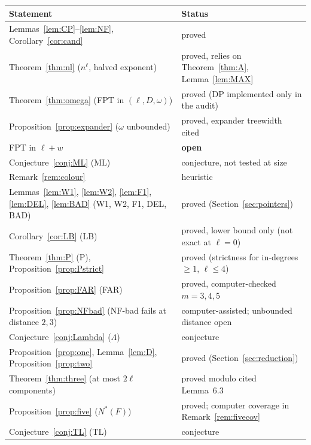 \begin{center}
\begin{tabular}{@{}ll@{}}
\hline
Statement & Status\\
\hline
Lemmas~\ref{lem:CP}--\ref{lem:NF}, Corollary~\ref{cor:cand} & proved\\
Theorem~\ref{thm:nl} ($n^{\ell}$, halved exponent) & proved, relies on Theorem~\ref{thm:A}, Lemma~\ref{lem:MAX}\\
Theorem~\ref{thm:omega} (FPT in $(\ell,D,\omega)$) & proved (DP implemented only in the audit)\\
Proposition~\ref{prop:expander} ($\omega$ unbounded) & proved, expander treewidth cited~\cite{GM09}\\
FPT in $\ell+w$ & \textbf{open}\\
Conjecture~\ref{conj:ML} (ML) & conjecture, not tested at size\\
Remark~\ref{rem:colour} & heuristic\\
Lemmas~\ref{lem:W1}, \ref{lem:W2}, \ref{lem:F1}, \ref{lem:DEL}, \ref{lem:BAD} (W1, W2, F1, DEL, BAD) & proved (Section~\ref{sec:pointers})\\
Corollary~\ref{cor:LB} (LB) & proved, lower bound only (not exact at $\ell=0$)\\
Theorem~\ref{thm:P} (P), Proposition~\ref{prop:Pstrict} & proved (strictness for in-degrees $\ge1$, $\ell\le4$)\\
Proposition~\ref{prop:FAR} (FAR) & proved, computer-checked $m=3,4,5$\\
Proposition~\ref{prop:NFbad} (NF-bad fails at distance $2,3$) & computer-assisted; unbounded distance open\\
Conjecture~\ref{conj:Lambda} ($\Lambda$) & conjecture\\
Proposition~\ref{prop:one}, Lemma~\ref{lem:D}, Proposition~\ref{prop:two} & proved (Section~\ref{sec:reduction})\\
Theorem~\ref{thm:three} (at most $2\ell$ components) & proved modulo cited~\cite{BFK18} Lemma~6.3\\
Proposition~\ref{prop:five} ($N^*(F)$) & proved; computer coverage in Remark~\ref{rem:fivecov}\\
Conjecture~\ref{conj:TL} (TL) & conjecture\\
\hline
\end{tabular}
\end{center}
